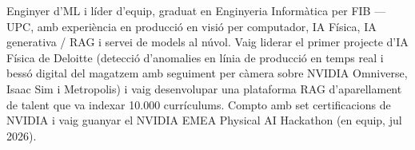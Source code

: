 
\begin{cvparagraph}
    Enginyer d'ML i líder d'equip, graduat en Enginyeria Informàtica per FIB --- UPC, amb experiència en producció en visió per computador, IA Física, IA generativa / RAG i servei de models al núvol. Vaig liderar el primer projecte d'IA Física de Deloitte (detecció d'anomalies en línia de producció en temps real i bessó digital del magatzem amb seguiment per càmera sobre NVIDIA Omniverse, Isaac Sim i Metropolis) i vaig desenvolupar una plataforma RAG d'aparellament de talent que va indexar 10.000 currículums. Compto amb set certificacions de NVIDIA i vaig guanyar el NVIDIA EMEA Physical AI Hackathon (en equip, jul 2026).
\end{cvparagraph}
